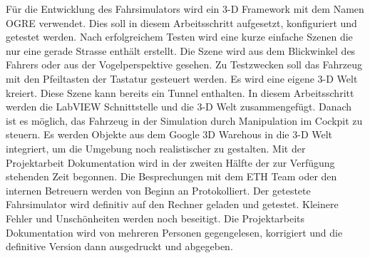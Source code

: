 Für die Entwicklung des Fahrsimulators wird ein 3-D Framework mit dem Namen OGRE verwendet. Dies soll in diesem Arbeitsschritt aufgesetzt, konfiguriert und getestet werden. Nach erfolgreichem Testen wird eine kurze einfache Szenen die nur eine gerade Strasse enthält erstellt. Die Szene wird aus dem Blickwinkel des Fahrers oder aus der Vogelperspektive gesehen. Zu Testzwecken soll das Fahrzeug mit den Pfeiltasten der Tastatur gesteuert werden.
Es wird eine eigene 3-D Welt kreiert. Diese Szene kann bereits ein Tunnel enthalten. 
In diesem Arbeitsschritt werden die LabVIEW Schnittstelle und die 3-D Welt zusammengefügt. Danach ist es möglich, das Fahrzeug in der Simulation durch Manipulation im Cockpit zu steuern. 
Es werden Objekte aus dem Google 3D Warehous in die 3-D Welt integriert, um die Umgebung noch realistischer zu gestalten. 
Mit der Projektarbeit Dokumentation wird in der zweiten Hälfte der zur Verfügung stehenden Zeit begonnen. Die Besprechungen mit dem ETH Team oder den internen Betreuern werden von Beginn an Protokolliert.
Der getestete Fahrsimulator wird definitiv auf den Rechner geladen und getestet. Kleinere Fehler und Unschönheiten werden noch beseitigt. 
Die Projektarbeits Dokumentation wird von mehreren Personen gegengelesen, korrigiert und die definitive Version dann ausgedruckt und abgegeben. 
